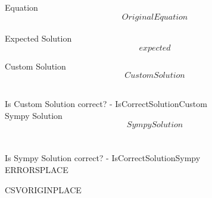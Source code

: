 \documentclass[12pt,fleqn]{article}
\begin{document}
Equation\\
$$OriginalEquation$$
\\

Expected Solution\\
$$expected$$

Custom Solution\\
$$CustomSolution$$

\\ Is Custom Solution correct? - IsCorrectSolutionCustom \\

Sympy Solution\\
$$SympySolution$$
\\
\\ Is Sympy Solution correct? - IsCorrectSolutionSympy \\

ERRORSPLACE

CSVORIGINPLACE
\end{document}
